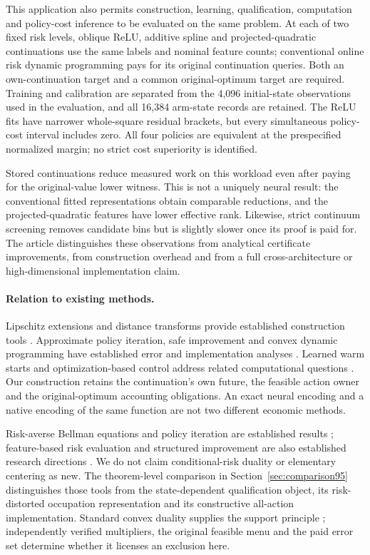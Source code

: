 \documentclass[ecta,nameyear,draft]{econsocart}
\begin{document}
This application also permits construction, learning, qualification, computation and policy-cost inference to be evaluated on the same problem. At each of two fixed risk levels, oblique ReLU, additive spline and projected-quadratic continuations use the same labels and nominal feature counts; conventional online risk dynamic programming pays for its original continuation queries. Both an own-continuation target and a common original-optimum target are required. Training and calibration are separated from the 4,096 initial-state observations used in the evaluation, and all 16,384 arm-state records are retained. The ReLU fits have narrower whole-square residual brackets, but every simultaneous policy-cost interval includes zero. All four policies are equivalent at the prespecified normalized margin; no strict cost superiority is identified.

Stored continuations reduce measured work on this workload even after paying for the original-value lower witness. This is not a uniquely neural result: the conventional fitted representations obtain comparable reductions, and the projected-quadratic features have lower effective rank. Likewise, strict continuum screening removes candidate bins but is slightly slower once its proof is paid for. The article distinguishes these observations from analytical certificate improvements, from construction overhead and from a full cross-architecture or high-dimensional implementation claim.

\paragraph{Relation to existing methods.}
Lipschitz extensions and distance transforms provide established construction tools \citep{mcshane1934,felzenszwalb2012}. Approximate policy iteration, safe improvement and convex dynamic programming have established error and implementation analyses \citep{munos2003,pirotta2013,scherrer2015,yang2020convex}. Learned warm starts and optimization-based control address related computational questions \citep{sakaue2023warm,sambharya2023,agrawal2020control}. Our construction retains the continuation's own future, the feasible action owner and the original-optimum accounting obligations. An exact neural encoding and a native encoding of the same function are not two different economic methods.

Risk-averse Bellman equations and policy iteration are established results \citep{ruszczynski2010risk,ruszczynski2014erratum}; feature-based risk evaluation and structured improvement are also established research directions \citep{ruszczynskiyang2025}. We do not claim conditional-risk duality or elementary centering as new. The theorem-level comparison in Section~\ref{sec:comparison95} distinguishes those tools from the state-dependent qualification object, its risk-distorted occupation representation and its constructive all-action implementation. Standard convex duality supplies the support principle \citep{boyd2004}; independently verified multipliers, the original feasible menu and the paid error set determine whether it licenses an exclusion here.
\end{document}
